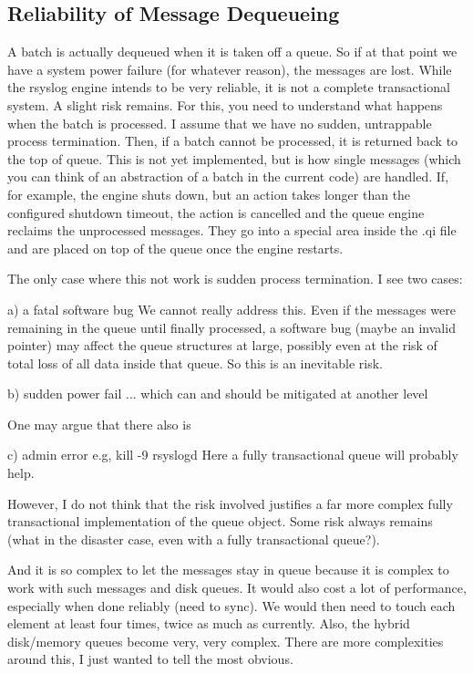 \documentclass[a4paper,10pt]{article}
\begin{document}
\subsection{Reliability of Message Dequeueing}
A batch is actually dequeued when it is taken off a queue. So if at that point we
have a system power failure (for whatever reason), the messages are lost.
While the rsyslog engine intends to be very reliable, it is not a complete
transactional system. A slight risk remains. For this, you need to understand
what happens when the batch is processed. I assume that we have no sudden,
untrappable process termination. Then, if a batch cannot be processed, it is
returned back to the top of queue. This is not yet implemented, but is how
single messages (which you can think of an abstraction of a batch in the
current code) are handled. If, for example, the engine shuts down, but an
action takes longer than the configured shutdown timeout, the action is
cancelled and the queue engine reclaims the unprocessed messages. They go
into a special area inside the .qi file and are placed on top of the queue
once the engine restarts.

The only case where this not work is sudden process termination. I see two
cases:

a) a fatal software bug
We cannot really address this. Even if the messages were remaining in the
queue until finally processed, a software bug (maybe an invalid pointer) may
affect the queue structures at large, possibly even at the risk of total loss
of all data inside that queue. So this is an inevitable risk.

b) sudden power fail
... which can and should be mitigated at another level

One may argue that there also is

c) admin error
e.g, kill -9 rsyslogd
Here a fully transactional queue will probably help.

However, I do not think that the risk involved justifies a far more complex
fully transactional implementation of the queue object. Some risk always
remains (what in the disaster case, even with a fully transactional queue?).

And it is so complex to let the messages stay in queue because it is complex
to work with such messages and disk queues. It would also cost a lot of
performance, especially when done reliably (need to sync). We would then need
to touch each element at least four times, twice as much as currently. Also,
the hybrid disk/memory queues become very, very complex. There are more
complexities around this, I just wanted to tell the most obvious.
\end{document}
